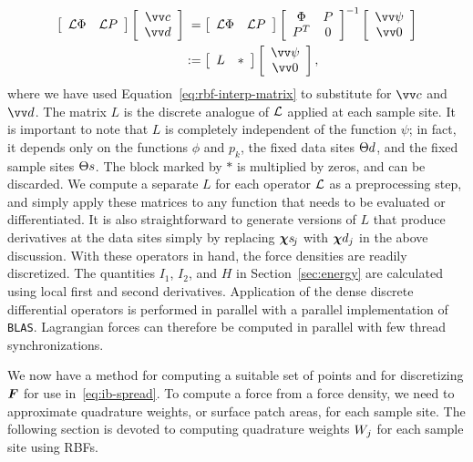 \begin{equation}\label{eq:rbf-operator}
    \begin{aligned}
    \left[\begin{array}{cc}
            \L\Phi & \L P
    \end{array}\right]\left[\begin{array}{c}
            \arr{c} \\ \arr{d}
    \end{array}\right] &\hphantom{:}=
    \left[\begin{array}{cc}
            \L\Phi & \L P
    \end{array}\right]\left[\begin{array}{cc}
            \Phi & P \\ P^T & 0
    \end{array}\right]^{-1}\left[\begin{array}{c}
            \arr{\psi} \\ \arr{0}
    \end{array}\right] \\ &:=
    \left[\begin{array}{cc}
            L & \ast
    \end{array}\right]\left[\begin{array}{c}
            \arr{\psi} \\ \arr{0}
    \end{array}\right],
\end{aligned}
\end{equation}
where we have used Equation~\eqref{eq:rbf-interp-matrix} to substitute for $\arr{c}$ and
$\arr{d}$. The matrix $L$ is the discrete analogue of $\mathcal{L}$ applied at each sample site.
It is
important to note that $L$ is completely independent of the function $\psi$; in fact, it
depends only on the functions $\phi$ and $p_k$, the fixed data sites $\data\sites$, and
the fixed sample sites $\sample\sites$.  The block marked by $\ast$ is multiplied by
zeros, and can be discarded. We compute a separate $L$ for each operator $\mathcal{L}$ as a
preprocessing step, and simply apply these matrices to any function that needs to be
evaluated or differentiated. It is also straightforward to generate versions of $L$ that
produce derivatives at the data sites simply by replacing $\Xpsj$ with $\data\Xp_j$ in
the above discussion. With these operators in hand, the force densities are readily
discretized. The quantities $I_1$, $I_2$, and $H$ in Section~\ref{sec:energy} are
calculated using local first and second derivatives. Application of the dense discrete
differential operators is performed in parallel with a parallel implementation of
\texttt{BLAS}. Lagrangian forces can therefore be computed in parallel with few thread
synchronizations.

We now have a method for computing a suitable set of points and for discretizing $\boldsymbol{F}$ for
use in~\eqref{eq:ib-spread}. To compute a force from a force density, we need to
approximate quadrature weights, or surface patch areas, for each sample site. The
following section is devoted to computing quadrature weights $\weight[j]$ for each
sample site using RBFs.

